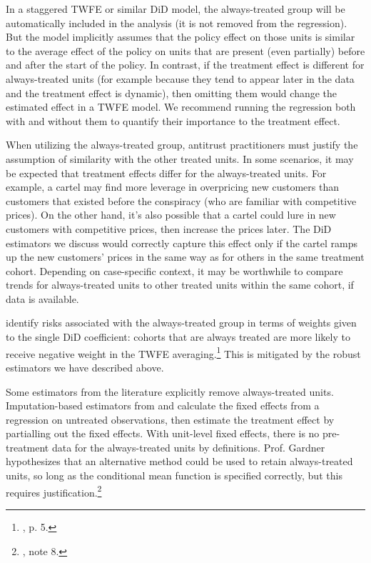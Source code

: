 \documentclass[12pt]{article}
\begin{document}
In a staggered TWFE or similar DiD model, the always-treated group will be automatically included in the analysis (it is not removed from the regression). But the model implicitly assumes that the policy effect on those units is similar to the average effect of the policy on units that are present (even partially) before and after the start of the policy. In contrast, if the treatment effect is different for always-treated units (for example because they tend to appear later in the data and the treatment effect is dynamic), then omitting them would change the estimated effect in a TWFE model. We recommend running the regression both with and without them to quantify their importance to the treatment effect.

When utilizing the always-treated group, antitrust practitioners must justify the assumption of similarity with the other treated units. In some scenarios, it may be expected that treatment effects differ for the always-treated units. For example, a cartel may find more leverage in overpricing new customers than customers that existed before the conspiracy (who are familiar with competitive prices). On the other hand, it’s also possible that a cartel could lure in new customers with competitive prices, then increase the prices later. The DiD estimators we discuss would correctly capture this effect only if the cartel ramps up the new customers’ prices in the same way as for others in the same treatment cohort. Depending on case-specific context, it may be worthwhile to compare trends for always-treated units to other treated units within the same cohort, if data is available.

\citet{de2023two} identify risks associated with the always-treated group in terms of weights given to the single DiD coefficient: cohorts that are always treated are more likely to receive negative weight in the TWFE averaging.\footnote{\citet{de2023two}, p. 5.}  This is mitigated by the robust estimators we have described above.

Some estimators from the literature explicitly remove always-treated units. Imputation-based estimators from \citet{borusyak2024revisiting} and \citet{gardner2022a} calculate the fixed effects from a regression on untreated observations, then estimate the treatment effect by partialling out the fixed effects. With unit-level fixed effects, there is no pre-treatment data for the always-treated units by definitions. Prof. Gardner hypothesizes that an alternative method could be used to retain always-treated units, so long as the conditional mean function is specified correctly, but this requires justification.\footnote{\citet{gardner2022a}, note 8.}
\end{document}
